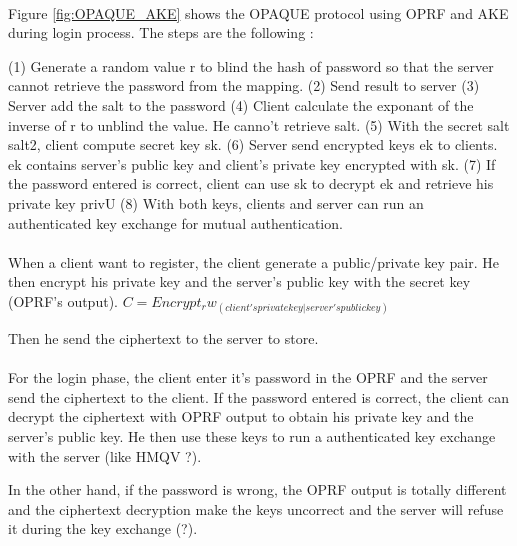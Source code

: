 \documentclass[../report.tex]{subfiles}
\begin{document}
\paragraph{}

Figure \ref{fig:OPAQUE_AKE} shows the OPAQUE protocol using OPRF and AKE during login process.
The steps are the following :

(1) Generate a random value r to blind the hash of password so that the server cannot retrieve the password from the mapping.
(2) Send result to server
(3) Server add the salt to the password
(4) Client calculate the exponant of the inverse of r to unblind the value. He canno't retrieve salt.
(5) With the secret salt salt2, client compute secret key sk.
(6) Server send encrypted keys ek to clients. ek contains server's public key and client's private key encrypted with sk.
(7) If the password entered is correct, client can use sk to decrypt ek and retrieve his private key privU
(8) With both keys, clients and server can run an authenticated key exchange for mutual authentication.


\paragraph{}
When a client want to register, the client generate a public/private key pair. He then encrypt his private key and the server's public key with the secret key (OPRF's output).
$C = Encrypt_rw_(client's private key | server's public key)$

Then he send the ciphertext to the server to store.


\paragraph{}
For the login phase, the client enter it's password in the OPRF and the server send the ciphertext to the client.
If the password entered is correct, the client can decrypt the ciphertext with OPRF output to obtain his private key and the server's public key.
He then use these keys to run a authenticated key exchange with the server (like HMQV ?).

In the other hand, if the password is wrong, the OPRF output is totally different and the ciphertext decryption make the keys uncorrect and the server will refuse it during the key exchange (?). %
\end{document}
